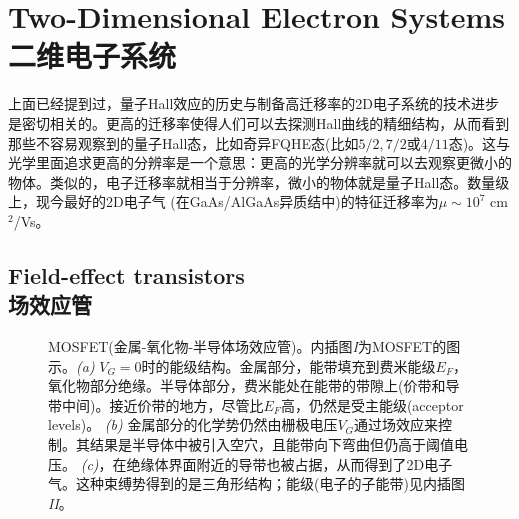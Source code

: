 \documentclass[10pt]{book}
\newcommand{\red}{\color{red}}
\begin{document}

\section[二维电子系统]{Two-Dimensional Electron Systems\\\bf 二维电子系统}
\label{2DEG}



上面已经提到过，量子Hall效应的历史与制备高迁移率的2D电子系统的技术进步是密切相关的。更高的迁移率使得人们可以去探测Hall曲线的精细结构，从而看到那些不容易观察到的量子Hall态，比如奇异FQHE态(比如$5/2, 7/2$或$4/11$态)。这与光学里面追求更高的分辨率是一个意思：更高的光学分辨率就可以去观察更微小的物体。类似的，电子迁移率就相当于分辨率，微小的物体就是量子Hall态。数量级上，现今最好的2D电子气 (在GaAs/AlGaAs异质结中)的特征迁移率为$\mu \sim 10^{7}$ cm$^2$/Vs。


\subsection[场效应管]{Field-effect transistors\\\bf 场效应管}

\begin{figure}
\begin{center}
\end{center}
\caption{ MOSFET(金属-氧化物-半导体场效应管)。内插图{\sl I}为MOSFET的图示。{\sl (a)} $V_G=0$时的能级结构。金属部分，能带填充到费米能级$E_F$，氧化物部分绝缘。半导体部分，费米能处在能带的带隙上(价带和导带中间)。接近价带的地方，尽管比$E_F$高，仍然是受主能级(acceptor levels)。
{\sl (b)} 金属部分的化学势仍然由栅极电压$V_G$通过场效应来控制。其结果是半导体中被引入空穴，且能带向下弯曲但仍高于阈值电压。 {\sl (c)}，在绝缘体界面附近的导带也被占据，从而得到了2D电子气。这种束缚势得到的是三角形结构；能级(电子的子能带)见内插图{\sl II}。
}
\label{fig04}
\end{figure}
\renewcommand*{\thefootnote}{\fnsymbol{footnote}}
\end{document}
